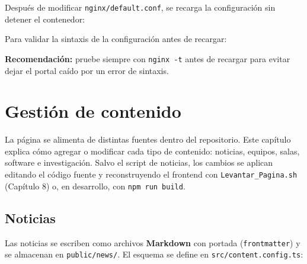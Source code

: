 \documentclass[12pt,a4paper]{report}
\begin{document}
Después de modificar \texttt{nginx/default.conf}, se recarga la configuración
sin detener el contenedor:


Para validar la sintaxis de la configuración antes de recargar:


\begin{mdframed}[style=importantstyle]
  \textbf{Recomendación:} pruebe siempre con \texttt{nginx -t} antes de
  recargar para evitar dejar el portal caído por un error de sintaxis.
\end{mdframed}

\chapter{Gestión de contenido}

La página se alimenta de distintas fuentes dentro del repositorio. Este
capítulo explica cómo agregar o modificar cada tipo de contenido: noticias,
equipos, salas, software e investigación. Salvo el script de noticias, los
cambios se aplican editando el código fuente y reconstruyendo el frontend con
\texttt{Levantar\_Pagina.sh} (Capítulo 8) o, en desarrollo, con
\texttt{npm run build}.

\section{Noticias}

Las noticias se escriben como archivos \textbf{Markdown} con portada
(\texttt{frontmatter}) y se almacenan en \texttt{public/news/}. El esquema se
define en \texttt{src/content.config.ts}:

\end{document}
